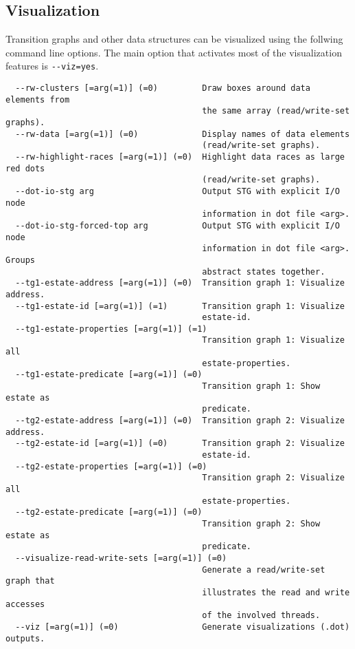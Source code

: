 \documentclass[natbib]{article}
\begin{document}
\subsection{Visualization}
Transition graphs and other data structures can be visualized using the follwing command line options.
The main option that activates most of the visualization features is \verb+--viz=yes+.
\begin{verbatim}
  --rw-clusters [=arg(=1)] (=0)         Draw boxes around data elements from 
                                        the same array (read/write-set graphs).
  --rw-data [=arg(=1)] (=0)             Display names of data elements 
                                        (read/write-set graphs).
  --rw-highlight-races [=arg(=1)] (=0)  Highlight data races as large red dots 
                                        (read/write-set graphs).
  --dot-io-stg arg                      Output STG with explicit I/O node 
                                        information in dot file <arg>.
  --dot-io-stg-forced-top arg           Output STG with explicit I/O node 
                                        information in dot file <arg>. Groups 
                                        abstract states together.
  --tg1-estate-address [=arg(=1)] (=0)  Transition graph 1: Visualize address.
  --tg1-estate-id [=arg(=1)] (=1)       Transition graph 1: Visualize 
                                        estate-id.
  --tg1-estate-properties [=arg(=1)] (=1)
                                        Transition graph 1: Visualize all 
                                        estate-properties.
  --tg1-estate-predicate [=arg(=1)] (=0)
                                        Transition graph 1: Show estate as 
                                        predicate.
  --tg2-estate-address [=arg(=1)] (=0)  Transition graph 2: Visualize address.
  --tg2-estate-id [=arg(=1)] (=0)       Transition graph 2: Visualize 
                                        estate-id.
  --tg2-estate-properties [=arg(=1)] (=0)
                                        Transition graph 2: Visualize all 
                                        estate-properties.
  --tg2-estate-predicate [=arg(=1)] (=0)
                                        Transition graph 2: Show estate as 
                                        predicate.
  --visualize-read-write-sets [=arg(=1)] (=0)
                                        Generate a read/write-set graph that 
                                        illustrates the read and write accesses
                                        of the involved threads.
  --viz [=arg(=1)] (=0)                 Generate visualizations (.dot) outputs.

\end{verbatim}
\end{document}
